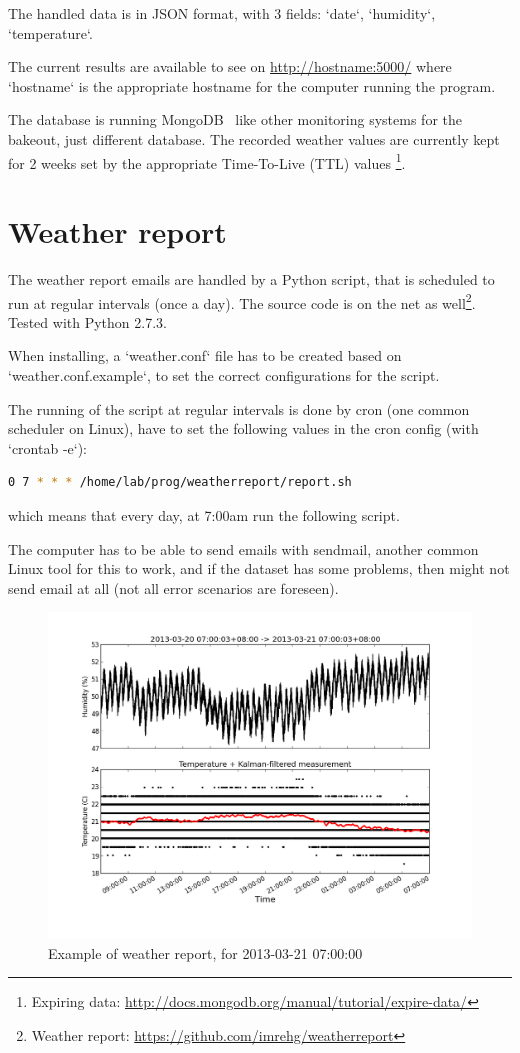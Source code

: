 \documentclass[12pt,a4paper]{article}
\begin{document}
The handled data is in JSON format, with 3 fields: `date`, `humidity`, `temperature`.

The current results are available to see on \url{http://hostname:5000/} where `hostname` is the appropriate hostname for the computer running the program.

The database is running MongoDB \, like other monitoring systems for the bakeout, just different database. The recorded weather values are currently kept for 2 weeks set by the appropriate Time-To-Live (TTL) values \footnote{Expiring data: \url{http://docs.mongodb.org/manual/tutorial/expire-data/}}.

\section{Weather report}

The weather report emails are handled by a Python script, that is scheduled to run at regular intervals (once a day). The source code is on the net as well\footnote{Weather report: \url{https://github.com/imrehg/weatherreport}}. Tested with Python 2.7.3.

When installing, a `weather.conf` file has to be created based on `weather.conf.example`, to set the correct configurations for the script.

The running of the script at regular intervals is done by cron (one common scheduler on Linux), have to set the following values in the cron config (with `crontab -e`):
\begin{lstlisting}[language=Bash,frame=single]
0 7 * * * /home/lab/prog/weatherreport/report.sh
\end{lstlisting}
which means that every day, at 7:00am run the following script.

The computer has to be able to send emails with sendmail, another common Linux tool for this to work, and if the dataset has some problems, then might not send email at all (not all error scenarios are foreseen).

\begin{figure}[ht!]
\centering
\includegraphics[width=140mm]{20130321-0700.png}
\caption{Example of weather report, for 2013-03-21 07:00:00}
\label{fig:weatherreport}
\end{figure}
\end{document}

